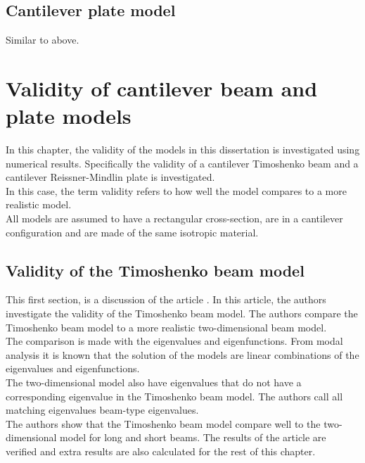 \documentclass[../main.tex]{subfiles}
\begin{document}
\subsection{Cantilever plate model}
Similar to above.

\section{Validity of cantilever beam and plate models}

In this chapter, the validity of the models in this dissertation is investigated using numerical results. Specifically the validity of a cantilever Timoshenko beam and a cantilever Reissner-Mindlin plate is investigated.\\

In this case, the term validity refers to how well the model compares to a more realistic model.\\

All models are assumed to have a rectangular cross-section, are in a cantilever configuration and are made of the same isotropic material.\\




\subsection{Validity of the Timoshenko beam model}
This first section, is a discussion of the article \cite{LVV09}. In this article, the authors investigate the validity of the Timoshenko beam model. The authors compare the Timoshenko beam model to a more realistic two-dimensional beam model.\\

The comparison is made with the eigenvalues and eigenfunctions. From modal analysis it is known that the solution of the models are linear combinations of the eigenvalues and eigenfunctions.\\

The two-dimensional model also have eigenvalues that do not have a corresponding eigenvalue in the Timoshenko beam model. The authors call all matching eigenvalues beam-type eigenvalues.\\

The authors show that the Timoshenko beam model compare well to the two-dimensional model for long and short beams. The results of the article are verified and extra results are also calculated for the rest of this chapter.\\
\end{document}
